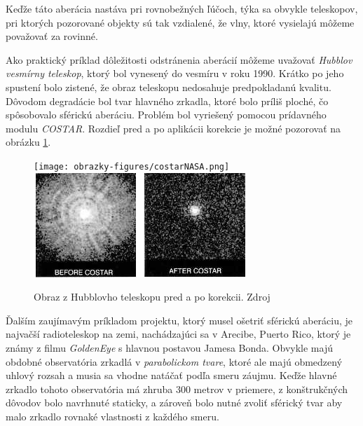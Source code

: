 Keďže táto aberácia nastáva pri rovnobežných ľúčoch, týka sa obvykle teleskopov, pri ktorých
pozorované objekty sú tak vzdialené, že vlny, ktoré vysielajú môžeme považovať za rovinné.

Ako praktický príklad dôležitosti odstránenia aberácií môžeme uvažovať \textit{Hubblov vesmírny
teleskop},
ktorý bol vynesený do vesmíru v roku 1990. Krátko po jeho spustení bolo zistené, že obraz
teleskopu nedosahuje predpokladanú kvalitu. Dôvodom degradácie bol tvar hlavného zrkadla, ktoré bolo
príliš ploché, čo spôsobovalo sférickú aberáciu. Problém bol vyriešený pomocou prídavného modulu
\textit{COSTAR}\cite{hechtoptics}. Rozdieľ pred a po aplikácii korekcie je možné pozorovať na obrázku
\ref{hubbleImage}. 

\begin{figure}
    \centering
    \texttt{[image: obrazky-figures/costarNASA.png]}
    \includegraphics[scale=0.6]{obrazky-figures/cosar.png}
    \caption{Obraz z Hubblovho teleskopu pred a po korekcii. Zdroj\cite{nasaHubble}}
    \label{hubbleImage}
\end{figure}

Ďalším zaujímavým príkladom projektu, ktorý musel ošetriť sférickú aberáciu, je najvačší
radioteleskop na zemi, nachádzajúci sa v Arecibe, Puerto Rico, ktorý je známy z filmu
\textit{GoldenEye} s hlavnou postavou Jamesa Bonda. 
Obvykle majú obdobné observatória zrkadlá v \textit{parabolickom tvare}, ktoré ale majú obmedzený
uhlový rozsah a musia sa vhodne natáčať podľa smeru záujmu. Keďže hlavné zrkadlo tohoto observatória má
zhruba 300 metrov v priemere, z konštrukčných dôvodov bolo navrhnuté staticky, a zároveň
bolo nutné zvoliť sférický tvar aby malo zrkadlo rovnaké vlastnosti z každého smeru.


